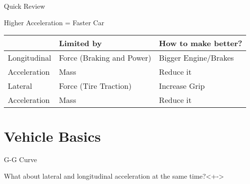 \documentclass[aspectratio=169]{beamer}
\begin{document}
\begin{frame}{Quick Review}

    \begin{block}{Higher Acceleration = Faster Car}

    \end{block}

    \begin{table}[]
    \begin{tabular}{l|ll}
                & Limited by                & How to make better? \\ \hline
    Longitudinal & Force (Braking and Power) & Bigger Engine/Brakes \\ \cline{2-3}
    Acceleration & Mass                      & Reduce it \\ \hline
    Lateral      & Force (Tire Traction)     & Increase Grip \\ \cline{2-3}
    Acceleration & Mass                      & Reduce it
    \end{tabular}
    \end{table}

\end{frame}

\section{Vehicle Basics}
\begin{frame}{G-G Curve}
    \begin{block}{What about lateral and longitudinal acceleration at the same time?}<+->
    \end{block}
\end{frame}
\end{document}
